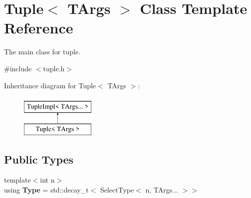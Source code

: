 \hypertarget{classTuple}{}\section{Tuple$<$ T\+Args $>$ Class Template Reference}
\label{classTuple}


The main class for tuple.  




{\ttfamily \#include $<$tuple.\+h$>$}

Inheritance diagram for Tuple$<$ T\+Args $>$\+:\begin{figure}[H]
\begin{center}
\leavevmode
\includegraphics[height=2.000000cm]{classTuple}
\end{center}
\end{figure}
\subsection*{Public Types}
\begin{DoxyCompactItemize}
\item 
\hypertarget{classTuple_a07a9f0c0c4565e78f4c5e49856146c34}{}\label{classTuple_a07a9f0c0c4565e78f4c5e49856146c34} 
{\footnotesize template$<$int n$>$ }\\using {\bfseries Type} = std\+::decay\+\_\+t$<$ Select\+Type$<$ n, T\+Args... $>$$>$
\end{DoxyCompactItemize}
